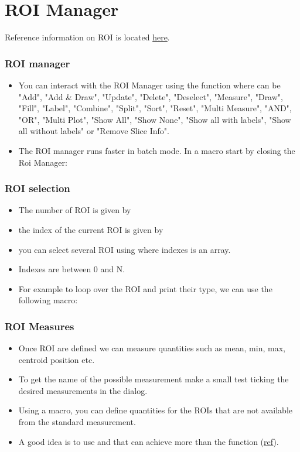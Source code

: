 \section{ROI Manager}
Reference information on ROI is located
\href{http://rsb.info.nih.gov/ij/developer/macro/functions.html#Roi}{here}.
\begin{frame}[fragile]
  \frametitle<presentation>{ROI manager}
  \begin{itemize}
   \item You can interact with the ROI Manager using the function
      where  can be "Add", "Add \&
     Draw", "Update", "Delete", "Deselect", "Measure", "Draw", "Fill",
     "Label", "Combine", "Split", "Sort", "Reset", "Multi Measure",
     "AND", "OR", "Multi Plot", "Show All", "Show None", "Show all with
     labels", "Show all without labels" or "Remove Slice Info".
   \item The ROI manager runs faster in batch mode. In a macro start
     by closing the Roi Manager:
     
  \end{itemize}
\end{frame}

\begin{frame}[fragile]
  \frametitle<presentation>{ROI selection}
  \begin{itemize}
  \item The number of ROI is given by 
  \item the index of the current ROI is given by 
  \item you can select several ROI using  where indexes is an array.
     \item Indexes are between 0 and N.
     \item For example to loop over the ROI and print their type, we
       can use the following macro:\par
       
  \end{itemize}
\end{frame}

\begin{frame}[fragile]
  \frametitle<presentation>{ROI Measures}
  \begin{itemize}
  \item Once ROI are defined we can measure quantities such as mean,
    min, max, centroid position etc.
  \item To get the name of the possible measurement make a small test
    ticking the desired measurements in the  dialog.
  \item Using a macro, you can define quantities for the ROIs that are not
    available from the standard measurement.
  \item A good idea is to use  and
     that can achieve more than the
     function (\href{http://rsb.info.nih.gov/ij/developer/macro/functions.html#getStatistics}{ref}).
  \end{itemize}
\end{frame}

